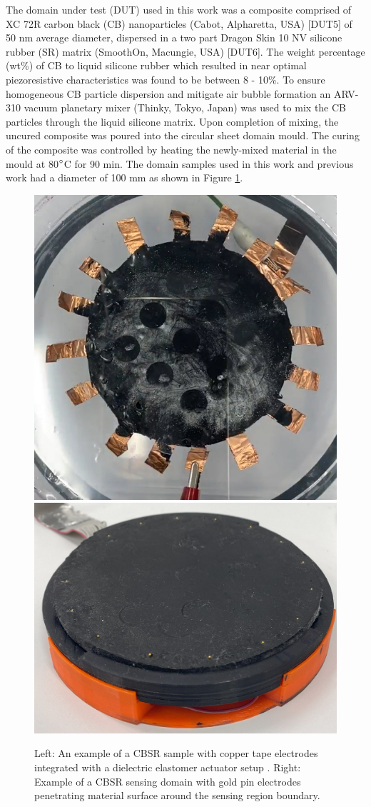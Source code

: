 The domain under test (DUT) used in this work was a composite comprised of XC 72R carbon black (CB) nanoparticles (Cabot, Alpharetta, USA) [DUT5] of 50 nm average diameter, dispersed in a two part Dragon Skin 10 NV silicone rubber (SR) matrix (SmoothOn, Macungie, USA) [DUT6]. The weight percentage (wt\%) of CB to liquid silicone rubber which resulted in near optimal piezoresistive characteristics was found to be between 8 - 10\%. To ensure homogeneous CB particle dispersion and mitigate air bubble formation an ARV-310 vacuum planetary mixer (Thinky, Tokyo, Japan) was used to mix the CB particles through the liquid silicone matrix. Upon completion of mixing, the uncured composite was poured into the circular sheet domain mould. The curing of the composite was controlled by heating the newly-mixed material in the mould at 80$\degree$C for 90 min. The domain samples used in this work and previous work \cite{Ellingham2022, Ellingham2024} had a diameter of 100 mm as shown in Figure \ref{fig:CBSR_samples_examples}. 

\begin{figure}[H]
\centering
\includegraphics[width=0.3\linewidth]{Figures/DEA-EIT-sample_0.5mm_100mm.png}
\hspace{2cm}
\includegraphics[width=0.4\linewidth]{Figures/CBSR_DUT_w_electrodes_sample.jpg}
\caption{Left: An example of a CBSR sample with copper tape electrodes integrated with a dielectric elastomer actuator setup \cite{Ellingham2024a}. Right: Example of a CBSR sensing domain with gold pin electrodes penetrating material surface around the sensing region boundary.}
\label{fig:CBSR_samples_examples}
\end{figure}


